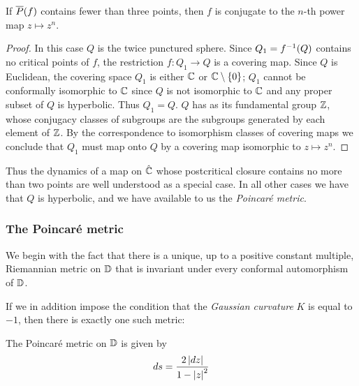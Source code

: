 \documentclass[../main.tex]{subfiles}
\newcommand\postcl[1]{\cl{P}\if\relax\detokenize{#1}\relax\else(#1)\fi}
\begin{document}
\begin{lem}\label{lem:exceptional-Pf}
If $\postcl{f}$ contains fewer than three points, then $f$ is conjugate to the $n$-th power map $z \mapsto z^n$.
\end{lem}
\begin{proof}
In this case $Q$ is the twice punctured sphere. Since $Q_1 = f^{-1}(Q)$ contains no critical points of $f$, the restriction $f : Q_1 \to Q$ is a covering map. Since $Q$ is Euclidean, the covering space $Q_1$ is either $\mathbb{C}$ or $\mathbb{C}\setminus\{0\}$; $Q_1$ cannot be conformally isomorphic to $\mathbb{C}$ since $Q$ is not isomorphic to $\mathbb{C}$ and any proper subset of $Q$ is hyperbolic. Thus $Q_1 = Q$. $Q$ has as its fundamental group $\mathbb{Z}$, whose conjugacy classes of subgroups are the subgroups generated by each element of $\mathbb{Z}$. By the correspondence to isomorphism classes of covering maps we conclude that $Q_1$ must map onto $Q$ by a covering map isomorphic to $z \mapsto z^n$.
\end{proof}

Thus the dynamics of a map on $\hat{\mathbb{C}}$ whose postcritical closure contains no more than two points are well understood as a special case. In all other cases we have that $Q$ is hyperbolic, and we have available to us the \emph{Poincaré metric}.

\subsubsection{The Poincaré metric}

We begin with the fact that there is a unique, up to a positive constant multiple, Riemannian metric on $\mathbb{D}$ that is invariant under every conformal automorphism of $\mathbb{D}$.


If we in addition impose the condition that the \emph{Gaussian curvature} $K$ is equal to $-1$, then there is exactly one such metric:

\begin{exl}
The Poincaré metric on $\mathbb{D}$ is given by
\[
ds = \frac{2\left|dz\right|}{1-\left|z\right|^2}
\]
\end{exl}
\end{document}
